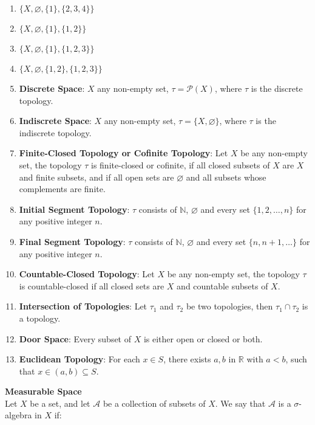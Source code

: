 \documentclass[12pt]{article}
\let\emptyset\varnothing
\begin{document}
\begin{enumerate}[itemsep=0pt, parsep=0pt, partopsep=0pt, topsep=0pt]
\item $\{X, \emptyset, \{1\}, \{2,3,4\}\}$
\item $\{X, \emptyset, \{1\}, \{1,2\}\}$
\item $\{X, \emptyset, \{1\}, \{1,2,3\}\}$
\item $\{X, \emptyset, \{1,2\}, \{1,2,3\}\}$
\item \textbf{Discrete Space}: $X$ any non-empty set, $\tau=\mathcal{P}(X)$, where $\tau$ is the discrete topology. 
\item \textbf{Indiscrete Space}: $X$ any non-empty set, $\tau=\{X,\emptyset\}$, where $\tau$ is the indiscrete topology.
\item \textbf{Finite-Closed Topology or Cofinite Topology}: Let $X$ be any non-empty set, the topology $\tau$ is finite-closed or cofinite, if all closed subsets of $X$ are $X$ and finite subsets, and if all open sets are $\emptyset$ and all subsets whose complements are finite. 
\item \textbf{Initial Segment Topology}: $\tau$ consists of $\mathbb{N}$, $\emptyset$ and every set $\{1,2,\dots, n\}$ for any positive integer $n$.
\item \textbf{Final Segment Topology}: $\tau$ consists of $\mathbb{N}$, $\emptyset$ and every set $\{n,n+1,\dots \}$ for any positive integer $n$. 
\item \textbf{Countable-Closed Topology}: Let $X$ be any non-empty set, the topology $\tau$ is countable-closed if all closed sets are $X$ and countable subsets of $X$. 
\item \textbf{Intersection of Topologies}: Let $\tau_1$ and $\tau_2$ be two topologies, then $\tau_1 \cap \tau_2$ is a topology. 
\item \textbf{Door Space}: Every subset of $X$ is either open or closed or both.
\item \textbf{Euclidean Topology}: For each $x \in S$, there exists $a,b$ in $\mathbb{R}$ with $a<b$, such that $x\in(a,b)\subseteq S$. \\
\end{enumerate}

\noindent \textbf{Measurable Space} \\
\noindent Let $X$ be a set, and let $\mathcal{A}$ be a collection of subsets of $X$. We say that $\mathcal{A}$ is a $\sigma$-algebra in $X$ if:
\end{document}
